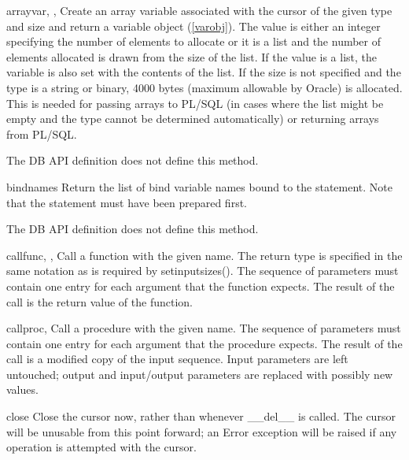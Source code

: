 \documentclass{manual}
\begin{document}
\begin{funcdesc}{arrayvar}{, , }
  Create an array variable associated with the cursor of the given type and
  size and return a variable object (\ref{varobj}). The value is either an
  integer specifying the number of elements to allocate or it is a list and
  the number of elements allocated is drawn from the size of the list. If the
  value is a list, the variable is also set with the contents of the list. If
  the size is not specified and the type is a string or binary, 4000 bytes
  (maximum allowable by Oracle) is allocated. This is needed for passing arrays
  to PL/SQL (in cases where the list might be empty and the type cannot be
  determined automatically) or returning arrays from PL/SQL.

   The DB API definition does not define this method.
\end{funcdesc}

\begin{funcdesc}{bindnames}{}
  Return the list of bind variable names bound to the statement. Note that the
  statement must have been prepared first.

   The DB API definition does not define this method.
\end{funcdesc}

\begin{funcdesc}{callfunc}{, ,
      }
  Call a function with the given name. The return type is specified in the
  same notation as is required by setinputsizes(). The sequence of parameters
  must contain one entry for each argument that the function expects.
  The result of the call is the return value of the function.
\end{funcdesc}

\begin{funcdesc}{callproc}{, }
  Call a procedure with the given name. The sequence of parameters must contain
  one entry for each argument that the procedure expects. The result of the
  call is a modified copy of the input sequence. Input parameters are left
  untouched; output and input/output parameters are replaced with possibly new
  values.
\end{funcdesc}

\begin{funcdesc}{close}{}
  Close the cursor now, rather than whenever __del__ is called. The cursor will
  be unusable from this point forward; an Error exception will be raised if any
  operation is attempted with the cursor.
\end{funcdesc}
\end{document}
